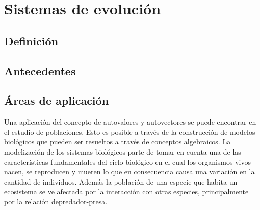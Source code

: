 \section{Sistemas de evolución}
\subsection{Definición}

\subsection{Antecedentes}

\subsection{Áreas de aplicación}




Una aplicación del concepto de autovalores y autovectores se puede encontrar en el estudio de poblaciones. Esto es posible a través de la construcción de modelos biológicos que pueden ser resueltos a través de conceptos algebraicos. 
La modelización de los sistemas biológicos parte de tomar en cuenta una de las características fundamentales del ciclo biológico en el cual los organismos vivos nacen, se reproducen y mueren lo que en consecuencia causa una variación en la cantidad de individuos. Además la población de una especie que habita un ecosistema se ve afectada por la interacción con otras especies, principalmente por la relación depredador-presa.



